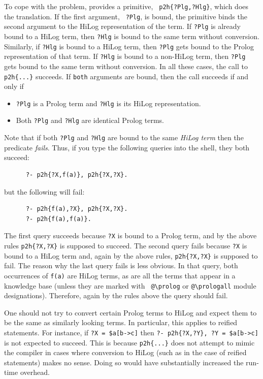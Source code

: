 \documentclass[11pt]{article}
\newcommand{\ERGO}{\mbox{\smaller{\ensuremath{\cal{E}}\smaller{{\sc{RGO}}}}}\xspace}
\newcommand{\FLSYSTEM}{\ERGO}
\newcommand{\bs}{\textbackslash}
\begin{document}
To cope with the problem, \FLSYSTEM provides a primitive, {\tt
  p2h\{?Plg,?Hlg\}}, which does the translation. If the first argument, {\tt
  ?Plg}, is bound, the primitive binds the second argument to the HiLog
representation of the term. If {\tt ?Plg} is already bound to a HiLog term,
then {\tt ?Hlg} is bound to the same term without conversion.  Similarly, if
{\tt ?Hlg} is bound to a HiLog term, then {\tt ?Plg} gets bound to the Prolog
representation of that term. If {\tt ?Hlg} is bound to a non-HiLog term,
then {\tt ?Plg} gets bound to the same term without conversion. In all these
cases, the call to {\tt p2h\{...\}} succeeds. If {\tt both} arguments are
bound, then the call succeeds if and only if
\begin{itemize}
\item {\tt ?Plg} is a Prolog term and {\tt ?Hlg} is its HiLog
  representation.
\item Both {\tt ?Plg} and {\tt ?Hlg} are identical Prolog terms.
\end{itemize}
Note that if both {\tt ?Plg} and {\tt ?Hlg} are bound to the same
\emph{HiLog term} then the predicate \emph{fails}. Thus, if you type the
following queries into the \FLSYSTEM shell, they both succeed:
\begin{verbatim}
      ?- p2h{?X,f(a)}, p2h{?X,?X}.
\end{verbatim}
but the following will fail:
\begin{verbatim}
      ?- p2h{f(a),?X}, p2h{?X,?X}.
      ?- p2h{f(a),f(a)}.
\end{verbatim}
The first query succeeds because {\tt ?X}  is bound to a Prolog term, and by the
above rules {\tt p2h\{?X,?X\}} is supposed to succeed. The second query fails
because {\tt ?X} is bound to a HiLog term and, again by the above rules,
{\tt p2h\{?X,?X\}} is supposed to fail.
The reason why the last query fails is less obvious.
In that query, both occurrences of {\tt f(a)} are HiLog terms, as are all the
terms that appear in a \FLSYSTEM knowledge base (unless they are marked with {\tt
  @\bs{}prolog} or {\tt @\bs{}prologall} module designations). Therefore, again by
the rules above the query should fail.

One should not try to convert certain Prolog terms to
HiLog and expect them to be the same as similarly looking \FLSYSTEM terms. In
particular, this applies to reified statements. For instance, if {\tt ?X =
\${a[b->c]}} then {\tt ?- p2h\{?X,?Y\}, ?Y = \${a[b->c]}} is not expected to
succeed. This is because {\tt p2h\{...\}} does not attempt to mimic the \FLSYSTEM
compiler in cases where conversion to HiLog (such as in the case of reified
statements) makes no sense. Doing so would have substantially increased the
run-time overhead.
\end{document}

